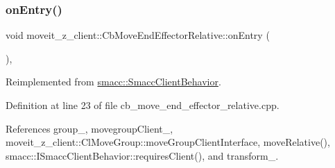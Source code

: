 \subsubsection{\texorpdfstring{on\+Entry()}{onEntry()}}
{\footnotesize\ttfamily void moveit\+\_\+z\+\_\+client\+::\+Cb\+Move\+End\+Effector\+Relative\+::on\+Entry (\begin{DoxyParamCaption}{ }\end{DoxyParamCaption})\hspace{0.3cm}{\ttfamily [override]}, {\ttfamily [virtual]}}



Reimplemented from \hyperlink{classsmacc_1_1SmaccClientBehavior_ad5d3e1f1697c3cfe66c94cadba948493}{smacc\+::\+Smacc\+Client\+Behavior}.



Definition at line 23 of file cb\+\_\+move\+\_\+end\+\_\+effector\+\_\+relative.\+cpp.



References group\+\_\+, movegroup\+Client\+\_\+, moveit\+\_\+z\+\_\+client\+::\+Cl\+Move\+Group\+::move\+Group\+Client\+Interface, move\+Relative(), smacc\+::\+I\+Smacc\+Client\+Behavior\+::requires\+Client(), and transform\+\_\+.


